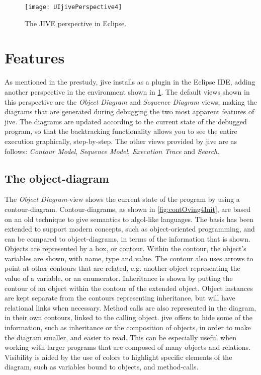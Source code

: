 \begin{figure}[H]
	\centering
	\texttt{[image: UIjivePerspective4]}
	\caption{The JIVE perspective in Eclipse.}
	\label{fig:UIjivePerspective}
\end{figure}

\section{Features}\label{jiveFeatures}
As mentioned in the prestudy, \gls{jive} installs as a plugin in the Eclipse IDE, adding another perspective in the environment shown in \cref{fig:UIjivePerspective}.
The default views shown in this perspective are the \emph{Object Diagram} and \emph{Sequence Diagram} views, making the diagrams that are generated during debugging the two most apparent features of \gls{jive}.
The diagrams are updated according to the current state of the debugged program, so that the backtracking functionality allows you to see the entire execution graphically, step-by-step.
The other views provided by \gls{jive} are as follows: \emph{Contour Model}, \emph{Sequence Model}, \emph{Execution Trace} and \emph{Search}.

\subsection{The object-diagram}\label{jiveFeatObjectDiag}
The \emph{Object Diagram}-view shows the current state of the program by using a contour-diagram.
Contour-diagrams, as shown in \cref{fig:contOving4Init}, are based on an old technique to give semantics to \acrshort{algol}-like languages.
The basis has been extended to support modern concepts, such as object-oriented programming, and can be compared to object-diagrams, in terms of the information that is shown.
Objects are represented by a box, or contour.
Within the contour, the object's variables are shown, with name, type and value.
The contour also uses arrows to point at other contours that are related, e.g. another object representing the value of a variable, or an enumerator.
Inheritance is shown by putting the contour of an object within the contour of the extended object. 
Object instances are kept separate from the contours representing inheritance, but will have relational links when necessary.
Method calls are also represented in the diagram, in their own contours, linked to the calling object.
\gls{jive} offers to hide some of the information, such as inheritance or the composition of objects, in order to make the diagram smaller, and easier to read.
This can be especially useful when working with larger programs that are composed of many objects and relations.
Visibility is aided by the use of colors to highlight specific elements of the diagram, such as variables bound to objects, and method-calls.


